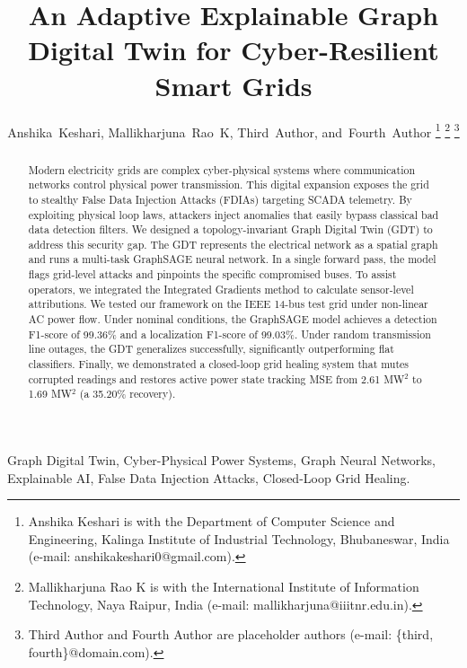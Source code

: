 \documentclass[journal]{IEEEtran}
\begin{document}
\title{An Adaptive Explainable Graph Digital Twin for Cyber-Resilient Smart Grids}

\author{Anshika~Keshari,
        Mallikharjuna~Rao~K,
        Third~Author,
        and~Fourth~Author%
\thanks{Anshika Keshari is with the Department of Computer Science and Engineering, Kalinga Institute of Industrial Technology, Bhubaneswar, India (e-mail: anshikakeshari0@gmail.com).}%
\thanks{Mallikharjuna Rao K is with the International Institute of Information Technology, Naya Raipur, India (e-mail: mallikharjuna@iiitnr.edu.in).}%
\thanks{Third Author and Fourth Author are placeholder authors (e-mail: \{third, fourth\}@domain.com).}%
}

\maketitle

\begin{abstract}
Modern electricity grids are complex cyber-physical systems where communication networks control physical power transmission. This digital expansion exposes the grid to stealthy False Data Injection Attacks (FDIAs) targeting SCADA telemetry. By exploiting physical loop laws, attackers inject anomalies that easily bypass classical bad data detection filters. We designed a topology-invariant Graph Digital Twin (GDT) to address this security gap. The GDT represents the electrical network as a spatial graph and runs a multi-task GraphSAGE neural network. In a single forward pass, the model flags grid-level attacks and pinpoints the specific compromised buses. To assist operators, we integrated the Integrated Gradients method to calculate sensor-level attributions. We tested our framework on the IEEE 14-bus test grid under non-linear AC power flow. Under nominal conditions, the GraphSAGE model achieves a detection F1-score of 99.36\% and a localization F1-score of 99.03\%. Under random transmission line outages, the GDT generalizes successfully, significantly outperforming flat classifiers. Finally, we demonstrated a closed-loop grid healing system that mutes corrupted readings and restores active power state tracking MSE from 2.61 MW$^2$ to 1.69 MW$^2$ (a 35.20\% recovery).
\end{abstract}

\begin{IEEEkeywords}
Graph Digital Twin, Cyber-Physical Power Systems, Graph Neural Networks, Explainable AI, False Data Injection Attacks, Closed-Loop Grid Healing.
\end{IEEEkeywords}
\end{document}
